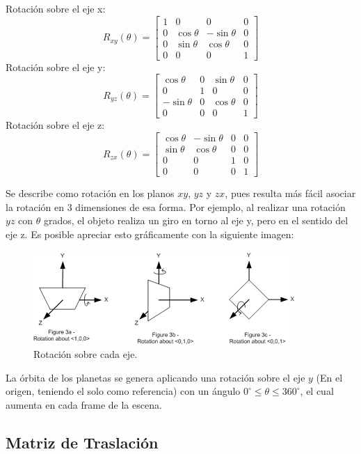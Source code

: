 \documentclass[journal]{IEEEtran}
\begin{document}
Rotación sobre el eje x:\\
\[
	R_{xy}(\theta) = \left[ 
		\begin{array}{cccc}
			1 & 0 & 0 & 0 \\
			0 & \cos\theta & -\sin\theta & 0 \\
			0 & \sin\theta & \cos\theta & 0 \\
			0 & 0 & 0 & 1
		\end{array}
	\right]
\]
Rotación sobre el eje y:\\
\[
	R_{yz}(\theta) = \left[ 
		\begin{array}{cccc}
			\cos\theta & 0 & \sin\theta & 0 \\
			0 & 1 & 0 & 0 \\
			-\sin\theta & 0 & \cos\theta & 0 \\
			0 & 0 & 0 & 1
		\end{array}
	\right]	
\]
Rotación sobre el eje z:\\
\[
	R_{zx}(\theta) = \left[ 
		\begin{array}{cccc}
			\cos\theta & -\sin\theta & 0 & 0 \\
			\sin\theta & \cos\theta & 0 & 0 \\
			0 & 0 & 1 & 0 \\
			0 & 0 & 0 & 1
		\end{array}
	\right]	
\]

Se describe como rotación en los planos $xy$, $yz$ y $zx$, pues resulta más fácil asociar la rotación en 3 dimensiones de esa forma. Por ejemplo, al realizar una rotación $yz$ con $\theta$ grados, el objeto realiza un giro en torno al eje y, pero en el sentido del eje z. Es posible apreciar esto gráficamente con la siguiente imagen:

\begin{figure}[h!]
	\includegraphics[height=0.15\textwidth]{rotation.png}
	\centering
	\caption{Rotación sobre cada eje.}
\end{figure}

La órbita de los planetas se genera aplicando una rotación sobre el eje $y$ (En el origen, teniendo el solo como referencia) con un ángulo $0^{\circ}\leq\theta\leq360^{\circ}$, el cual aumenta en cada frame de la escena.

\subsection{Matriz de Traslación}
\end{document}
